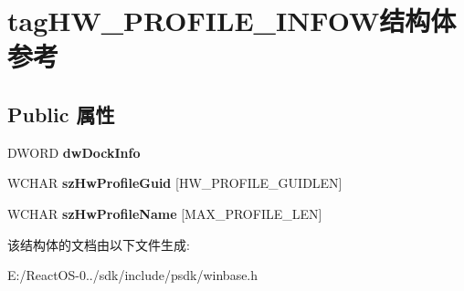 \hypertarget{structtag_h_w___p_r_o_f_i_l_e___i_n_f_o_w}{}\section{tag\+H\+W\+\_\+\+P\+R\+O\+F\+I\+L\+E\+\_\+\+I\+N\+F\+O\+W结构体 参考}
\label{structtag_h_w___p_r_o_f_i_l_e___i_n_f_o_w}
\subsection*{Public 属性}
\begin{DoxyCompactItemize}
\item 
\mbox{\label{structtag_h_w___p_r_o_f_i_l_e___i_n_f_o_w_a99e1fdb3ec7e87dd7c610cb34d05d6e7}} 
D\+W\+O\+RD {\bfseries dw\+Dock\+Info}
\item 
\mbox{\label{structtag_h_w___p_r_o_f_i_l_e___i_n_f_o_w_a1952918b3ebac3448df7f2ba8ecef223}} 
W\+C\+H\+AR {\bfseries sz\+Hw\+Profile\+Guid} \mbox{[}H\+W\+\_\+\+P\+R\+O\+F\+I\+L\+E\+\_\+\+G\+U\+I\+D\+L\+EN\mbox{]}
\item 
\mbox{\label{structtag_h_w___p_r_o_f_i_l_e___i_n_f_o_w_acc5b3ffffa341d8feaeb68ec34fe2ba1}} 
W\+C\+H\+AR {\bfseries sz\+Hw\+Profile\+Name} \mbox{[}M\+A\+X\+\_\+\+P\+R\+O\+F\+I\+L\+E\+\_\+\+L\+EN\mbox{]}
\end{DoxyCompactItemize}


该结构体的文档由以下文件生成\+:\begin{DoxyCompactItemize}
\item 
E\+:/\+React\+O\+S-\/0../sdk/include/psdk/winbase.\+h\end{DoxyCompactItemize}
